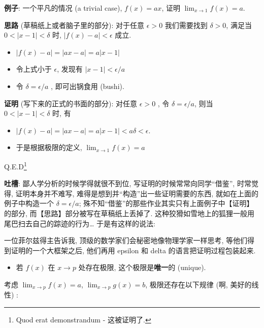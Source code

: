 \begin{tcolorbox}[size=fbox, breakable, enhanced jigsaw, title={极限 (limit)}]
\begin{newquote}
\textbf{例子}: 一个平凡的情况 (a trivial case), $f(x)=ax$, 证明
$\lim_{x\rightarrow 1}f(x)=a$.

\textbf{思路} (草稿纸上或者脑子里的部分): 对于任意 $\epsilon>0$
我们需要找到 $\delta>0$, 满足当 $0<|x-1|<\delta$ 时,
$|f(x)-a|<\epsilon$ 成立.

\begin{itemize}
\item
  $|f(x)-a|=|ax-a|=a|x-1|$
\item
  令上式小于 $\epsilon$, 发现有 $|x-1|<\epsilon/a$
\item
  令 $\delta=\epsilon/a$ , 即可出锅食用 (bushi).
\end{itemize}

\textbf{证明} (写下来的正式的书面的部分): 对任意 $\epsilon>0$ , 令
$\delta=\epsilon/a$, 则当 $0<|x-1|<\delta$ 时, 有

\begin{itemize}

\item
  $|f(x)-a|=|ax-a|=a|x-1|<a\delta<\epsilon$.
\item
  于是根据极限的定义, $\lim_{x\rightarrow 1}f(x)=a$
\end{itemize}

Q.E.D\footnote{Quod erat demonstrandum - 这被证明了.}

\textbf{吐槽}: 鄙人学分析的时候学得就很不到位,
写证明的时候常常向同学``借鉴'', 时常觉得, 证明本身并不难写,
难得是想到并``构造''出一些证明需要的东西, 就如在上面的例子中构造一个
$\delta=\epsilon/a$;
殊不知``借鉴''的那些作业其实只有上面例子中【证明】的部分,
而【思路】部分被写在草稿纸上丢掉了.
这种狡猾如雪地上的狐狸一般用尾巴扫去自己的踪迹的行为\ldots{}
于是有这样的说法:

一位菲尔兹得主告诉我, 顶级的数学家们会秘密地像物理学家一样思考,
等他们得到证明的一个大框架之后, 他们再用 epsilon 和 delta
的语言把证明过程包装起来.
\end{newquote}

\begin{itemize}

\item
  若 $f(x)$ 在 $x\rightarrow p$ 处存在极限,
  这个极限是\textbf{唯一}的 (unique).
\end{itemize}

考虑 $\lim_{x\rightarrow p}f(x)=a$, $\lim_{x\rightarrow p}g(x)=b$,
极限还存在以下规律 (啊, 美好的线性) :

\begin{itemize}


\end{itemize}
\end{tcolorbox}
